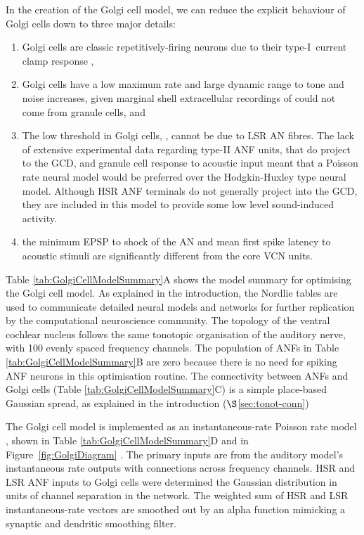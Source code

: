 In the creation of the Golgi cell model, we can reduce the explicit behaviour of
Golgi cells down to three major details:
\begin{enumerate}
\item Golgi cells are classic repetitively-firing neurons due to their
  type-I~current clamp response \citep{FerragamoGoldingEtAl:1998},
\item Golgi cells have a low maximum rate and large dynamic range to tone and
  noise increases, given marginal shell extracellular recordings of
  \citet{GhoshalKim:1997} could not come from granule cells, and
\item The low threshold in Golgi cells, \citet{GhoshalKim:1997}, cannot be due
  to LSR AN fibres. The lack of extensive experimental data regarding type-II
  ANF units, that do project to the GCD, and granule cell response to acoustic
  input meant that a Poisson rate neural model would be preferred over the
  Hodgkin-Huxley type neural model.  Although HSR ANF terminals do not generally
  project into the GCD, they are included in this model to provide some low
  level sound-induced activity.
\item the minimum EPSP to shock of the AN \citep{FerragamoGoldingEtAl:1998} and
  mean first spike latency to acoustic stimuli \citep{GhoshalKim:1997} are
  significantly different from the core VCN units.
\end{enumerate}

Table \ref{tab:GolgiCellModelSummary}A shows the model summary for optimising
the Golgi cell model. As explained in the introduction, the Nordlie tables are
used to communicate detailed neural models and networks for further replication
by the computational neuroscience community. The topology of the ventral
cochlear nucleus follows the same tonotopic organisation of the auditory nerve,
with 100 evenly spaced frequency channels. The population of ANFs in Table
\ref{tab:GolgiCellModelSummary}B are zero because there is no need for spiking
ANF neurons in this optimisation routine.  The connectivity between ANFs and Golgi cells (Table
\ref{tab:GolgiCellModelSummary}C) is a simple place-based Gaussian spread, as explained in the introduction ($\S$\ref{sec:tonot-conn})

 

The Golgi cell model is implemented as an instantaneous-rate Poisson rate model
, shown in Table \ref{tab:GolgiCellModelSummary}D and in
Figure~\ref{fig:GolgiDiagram} . The primary inputs are from the auditory model's
instantaneous rate outputs with connections across frequency channels. HSR and
LSR ANF inputs to Golgi cells were determined the Gaussian distribution in units
of channel separation in the network. The weighted sum of HSR and LSR
instantaneous-rate vectors are smoothed out by an alpha function mimicking a
synaptic and dendritic smoothing filter.

